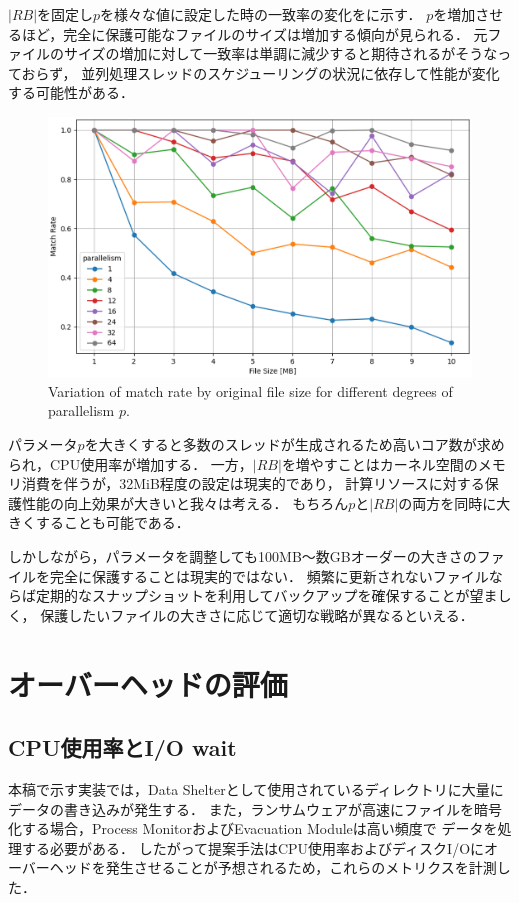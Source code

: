 $|RB|$を固定し$p$を様々な値に設定した時の一致率の変化をに示す．
$p$を増加させるほど，完全に保護可能なファイルのサイズは増加する傾向が見られる．
元ファイルのサイズの増加に対して一致率は単調に減少すると期待されるがそうなっておらず，
並列処理スレッドのスケジューリングの状況に依存して性能が変化する可能性がある．
\begin{figure}[tb]
  \centering
  \includegraphics[width=\columnwidth]{doc/img/eval/match_seek_diff_parallelism.eps}
  \caption{Variation of match rate by original file size for different degrees of parallelism $p$.}
  \label{fig:diff-parallelism}
\end{figure}

パラメータ$p$を大きくすると多数のスレッドが生成されるため高いコア数が求められ，CPU使用率が増加する．
一方，$|RB|$を増やすことはカーネル空間のメモリ消費を伴うが，32MiB程度の設定は現実的であり，
計算リソースに対する保護性能の向上効果が大きいと我々は考える．
もちろん$p$と$|RB|$の両方を同時に大きくすることも可能である．

しかしながら，パラメータを調整しても100MB〜数GBオーダーの大きさのファイルを完全に保護することは現実的ではない．
頻繁に更新されないファイルならば定期的なスナップショットを利用してバックアップを確保することが望ましく，
保護したいファイルの大きさに応じて適切な戦略が異なるといえる．

\section{オーバーヘッドの評価}
\subsection{CPU使用率とI/O wait}
本稿で示す実装では，Data Shelterとして使用されているディレクトリに大量にデータの書き込みが発生する．
また，ランサムウェアが高速にファイルを暗号化する場合，Process MonitorおよびEvacuation Moduleは高い頻度で
データを処理する必要がある．
したがって提案手法はCPU使用率およびディスクI/Oにオーバーヘッドを発生させることが予想されるため，これらのメトリクスを計測した．

